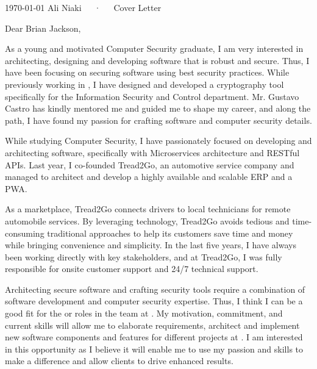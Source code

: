 \documentclass[11pt, letterpaper]{awesome-cv}
\begin{document}
\makecvheader[R]

\makecvfooter
  {\today}
  {Ali Niaki~~~·~~~Cover Letter}
  {}

\makelettertitle

\begin{cvletter}

  \begin{letterbodyen}
    Dear Brian Jackson,
    
    As a young and motivated Computer Security graduate, I am very interested in architecting, designing and developing software that is robust and secure. Thus, I have been focusing on securing software using best security practices. While previously working in \putcompanyname, I have designed and developed a cryptography tool specifically for the Information Security and Control department. Mr. Gustavo Castro has kindly mentored me and guided me to shape my career, and along the path, I have found my passion for crafting software and computer security details.

    While studying Computer Security, I have passionately focused on developing and architecting software, specifically with Microservices architecture and RESTful APIs. Last year, I co-founded Tread2Go, an automotive service company and managed to architect and develop a highly available and scalable ERP and a PWA.

    As a marketplace, Tread2Go connects drivers to local technicians for remote automobile services. By leveraging technology, Tread2Go avoids tedious and time-consuming traditional approaches to help its customers save time and money while bringing convenience and simplicity. In the last five years, I have always been working directly with key stakeholders, and at Tread2Go, I was fully responsible for onsite customer support and 24/7 technical support.

    Architecting secure software and crafting security tools require a combination of software development and computer security expertise. Thus, I think I can be a good fit for the  or  roles in the  team at \putcompanyname. My motivation, commitment, and current skills will allow me to elaborate requirements, architect and implement new software components and features for different projects at . I am interested in this opportunity as I believe it will enable me to use my passion and skills to make a difference and allow clients to drive enhanced results.


\end{letterbodyen}
\end{cvletter}
\end{document}

